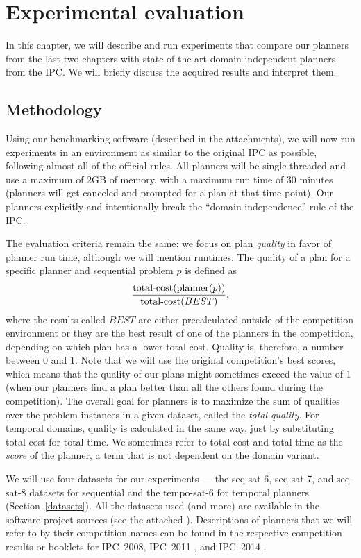 \chapter{Experimental evaluation}\label{experiments}

In this chapter, we will describe and run experiments
that compare our planners from the last two chapters
with state-of-the-art domain-independent planners from the IPC.
We will briefly discuss the acquired results and interpret them.

\section{Methodology}

Using our benchmarking software (described in the attachments), we will now run experiments in an
environment as similar to the original
IPC as possible, following almost all of the official rules.
All planners will be single-threaded and use a maximum of 2GB of memory, with a maximum run time of 30 minutes (planners will
get canceled and prompted for a plan at that time point).
Our planners explicitly and intentionally break the ``domain independence'' rule of the IPC.

The evaluation criteria remain the same:
we focus on plan \textit{quality} in favor of planner run time,
although we will mention runtimes.
The quality of a plan for a specific planner and sequential problem $p$ is defined as
$$\frac{\textrm{total-cost}(\textrm{planner}(p))}{\textrm{total-cost}(BEST)},$$
where the results called $BEST$
are either precalculated outside of the competition environment or they are the best result of one of the planners in the competition, depending on which plan has a lower total cost.
Quality is, therefore, a number between $0$ and $1$.
Note that we will use the original competition's best scores,
which means that the quality of our plans
might sometimes exceed the value of 1
(when our planners find a plan better than all the others found during the competition).
The overall goal for planners is to maximize the sum of qualities over the problem instances in a given dataset, called the \textit{total quality}.
For temporal domains, quality is calculated in the same way, just by substituting total cost
for total time. We sometimes refer to total cost and total time as the \textit{score} of the planner, a term that is not dependent on the domain variant.

We will use four datasets for our experiments --- the seq-sat-6, seq-sat-7,
and seq-sat-8 datasets for sequential
and the tempo-sat-6 for temporal planners (Section~\ref{datasets}).
All the datasets used (and more) are available in the
software project sources (see the attached ).
Descriptions of planners that we will refer to by their competition names can be found in the respective competition results or booklets for IPC~2008, IPC~2011 \citep{Garcia-Olaya2011}, and IPC~2014 \citep{Vallati2015}.

